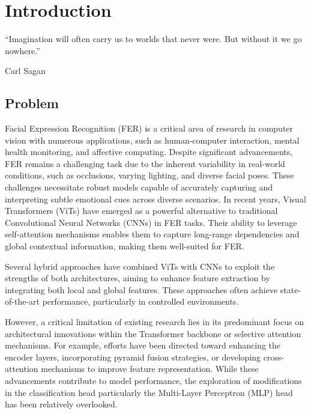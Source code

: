 \chapter{Introduction}
\label{chapter:introduction}


\epigraph{``Imagination will often carry us to worlds that never were. But without it we go nowhere.''}{Carl Sagan}

\newpage


\newpage

\section{Problem}


Facial Expression Recognition (FER) is a critical area of research in computer
vision with numerous applications, such as human-computer interaction, mental
health monitoring, and affective computing. Despite significant advancements, FER
remains a challenging task due to the inherent variability in real-world conditions,
such as occlusions, varying lighting, and diverse facial poses. These challenges
necessitate robust models capable of accurately capturing and interpreting subtle
emotional cues across diverse scenarios.
In recent years, Visual Transformers (ViTs) have emerged as a powerful alternative
to traditional Convolutional Neural Networks (CNNs) in FER tasks. Their ability to leverage self-attention mechanisms enables them to capture long-range dependencies
and global contextual information, making them well-suited for FER.

Several hybrid approaches have combined ViTs with CNNs to exploit the strengths of both architectures, aiming to enhance feature extraction by integrating both local
and global features. These approaches often achieve state-of-the-art performance, particularly in controlled environments.

However, a critical limitation of existing research lies in its predominant focus on architectural innovations within the Transformer backbone or selective attention
mechanisms. For example, efforts have been directed toward enhancing the encoder layers, incorporating pyramid fusion strategies, or developing cross-attention
mechanisms to improve feature representation. While these advancements contribute to model performance, the exploration of modifications in the classification head
particularly the Multi-Layer Perceptron (MLP) head has been relatively overlooked.

